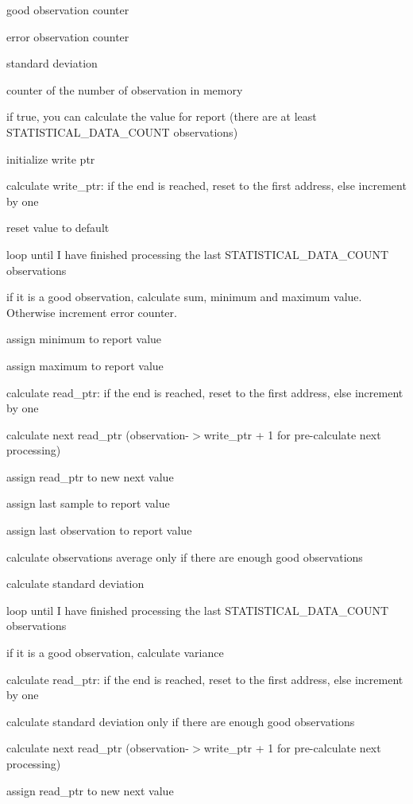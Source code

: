 good observation counter

error observation counter

standard deviation

counter of the number of observation in memory

if true, you can calculate the value for report (there are at least S\+T\+A\+T\+I\+S\+T\+I\+C\+A\+L\+\_\+\+D\+A\+T\+A\+\_\+\+C\+O\+U\+NT observations)

initialize write ptr

calculate write\+\_\+ptr\+: if the end is reached, reset to the first address, else increment by one

reset value to default

loop until I have finished processing the last S\+T\+A\+T\+I\+S\+T\+I\+C\+A\+L\+\_\+\+D\+A\+T\+A\+\_\+\+C\+O\+U\+NT observations

if it is a good observation, calculate sum, minimum and maximum value. Otherwise increment error counter.

assign minimum to report value

assign maximum to report value

calculate read\+\_\+ptr\+: if the end is reached, reset to the first address, else increment by one

calculate next read\+\_\+ptr (observation-\/$>$write\+\_\+ptr + 1 for pre-\/calculate next processing)

assign read\+\_\+ptr to new next value

assign last sample to report value

assign last observation to report value

calculate observations average only if there are enough good observations

calculate standard deviation

loop until I have finished processing the last S\+T\+A\+T\+I\+S\+T\+I\+C\+A\+L\+\_\+\+D\+A\+T\+A\+\_\+\+C\+O\+U\+NT observations

if it is a good observation, calculate variance

calculate read\+\_\+ptr\+: if the end is reached, reset to the first address, else increment by one

calculate standard deviation only if there are enough good observations

calculate next read\+\_\+ptr (observation-\/$>$write\+\_\+ptr + 1 for pre-\/calculate next processing)

assign read\+\_\+ptr to new next value \mbox{\label{i2c-th_8h_a8b67eda853f3e8cca0c729267b492861}} 

